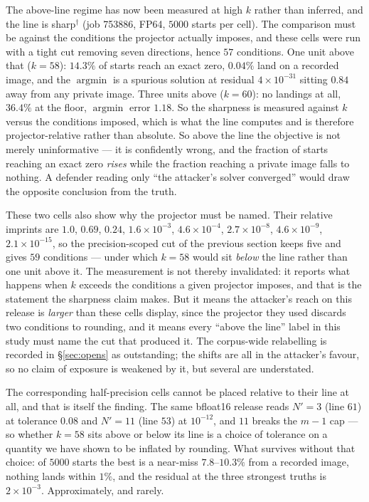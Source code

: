 The above-line regime has now been measured at high $k$ rather than inferred,
and the line is sharp$^\dagger$ (job 753886, FP64, $5000$ starts per cell).
The comparison must be against the conditions the projector
actually imposes, and these cells were run with a tight cut removing seven
directions, hence $57$ conditions. One unit above that ($k=58$): $14.3\%$ of
starts reach an exact zero, $0.04\%$ land on a recorded image, and the
$\operatorname{argmin}$ is a spurious solution at residual $4\times10^{-31}$
sitting $0.84$ away from any private image. Three units above ($k=60$): no
landings at all, $36.4\%$ at the floor, $\operatorname{argmin}$ error $1.18$.
So the sharpness is measured against $k$ versus the conditions imposed, which
is what the line computes and is therefore projector-relative rather than
absolute. So above the line the objective
is not merely uninformative --- it is confidently wrong, and the fraction of
starts reaching an exact zero \emph{rises} while the fraction reaching a
private image falls to nothing. A defender reading only ``the attacker's
solver converged'' would draw the opposite conclusion from the truth.

These two cells also show why the projector must be named. Their relative
imprints are $1.0$, $0.69$, $0.24$, $1.6\times10^{-3}$, $4.6\times10^{-4}$,
$2.7\times10^{-8}$, $4.6\times10^{-9}$, $2.1\times10^{-15}$, so the
precision-scoped cut of the previous section keeps five and gives $59$
conditions --- under which $k=58$ would sit \emph{below} the line rather than
one unit above it. The measurement is not thereby invalidated: it reports what
happens when $k$ exceeds the conditions a given projector imposes, and that is
the statement the sharpness claim makes. But it means the attacker's reach on
this release is \emph{larger} than these cells display, since the projector
they used discards two conditions to rounding, and it means every ``above the
line'' label in this study must name the cut that produced it. The
corpus-wide relabelling is recorded in \S\ref{sec:opens} as outstanding; the
shifts are all in the attacker's favour, so no claim of exposure is weakened
by it, but several are understated.

The corresponding half-precision cells cannot be placed relative to their line
at all, and that is itself the finding. The same bfloat16 release reads
$N'=3$ (line $61$) at tolerance $0.08$ and $N'=11$ (line $53$) at $10^{-12}$,
and $11$ breaks the $m-1$ cap --- so whether $k=58$ sits above or below its
line is a choice of tolerance on a quantity we have shown to be inflated by
rounding. What survives without that choice: of $5000$ starts the best is a
near-miss $7.8$--$10.3\%$ from a recorded image, nothing lands within $1\%$,
and the residual at the three strongest truths is $2\times10^{-3}$.
Approximately, and rarely.

